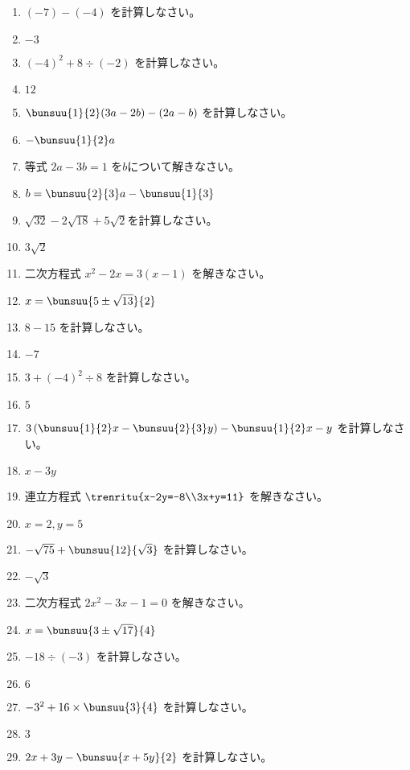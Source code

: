 \documentclass[uplatex,a4j,11pt]{jsreport}
\begin{document}
\begin{multicols}{2}
\begin{enumerate}
    \item $(-7)-(-4)$ を計算しなさい。%
    \item $-3$
    \item $(-4)^2+8\div (-2)$ を計算しなさい。%
    \item $12$
    \item $\bunsuu{1}{2}(3a-2b)-(2a-b)$ を計算しなさい。%
    \item $-\bunsuu{1}{2}a$
    \item 等式 $2a-3b=1$ を$b$について解きなさい。%
    \item $b=\bunsuu{2}{3}a-\bunsuu{1}{3}$
    \item $\sqrt{32}-2\sqrt{18}+5\sqrt{2}$を計算しなさい。%
    \item $3\sqrt{2}$
    \item 二次方程式 $x^2-2x=3(x-1)$ を解きなさい。%
    \item $x=\bunsuu{5\pm\sqrt{13}}{2}$
    \item $8-15$ を計算しなさい。%
    \item $-7$
    \item $3+(-4)^2\div 8$ を計算しなさい。%
    \item $5$
    \item $3\left(\bunsuu{1}{2}x-\bunsuu{2}{3}y\right)-\bunsuu{1}{2}x-y$ を計算しなさい。%
    \item $x-3y$
    \item 連立方程式 $\trenritu{x-2y=-8\\3x+y=11}$ を解きなさい。%
    \item $x=2, y=5$
    \item $-\sqrt{75}+\bunsuu{12}{\sqrt{3}}$ を計算しなさい。%
    \item $-\sqrt{3}$
    \item 二次方程式 $2x^2-3x-1=0$ を解きなさい。%
    \item $x=\bunsuu{3\pm\sqrt{17}}{4}$
    \item $-18\div (-3)$ を計算しなさい。%
    \item $6$
    \item $-3^2+16\times \bunsuu{3}{4}$ を計算しなさい。%
    \item $3$
    \item $2x+3y-\bunsuu{x+5y}{2}$ を計算しなさい。%

\end{enumerate}
\end{multicols}
\end{document}
